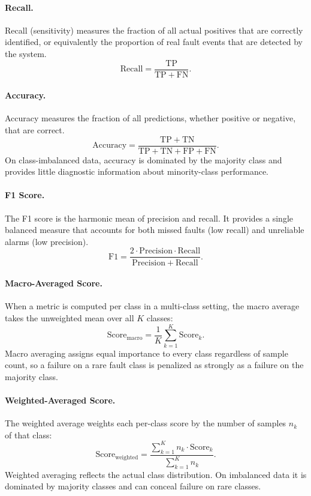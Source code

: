 \paragraph{Recall.}
Recall (sensitivity) measures the fraction of all actual positives that are correctly identified, or equivalently the proportion of real fault events that are detected by the system.
\[
  \mathrm{Recall} = \frac{\mathrm{TP}}{\mathrm{TP}+\mathrm{FN}}.
\]

\paragraph{Accuracy.}
Accuracy measures the fraction of all predictions, whether positive or negative, that are correct.
\[
  \mathrm{Accuracy} = \frac{\mathrm{TP}+\mathrm{TN}}{\mathrm{TP}+\mathrm{TN}+\mathrm{FP}+\mathrm{FN}}.
\]
On class-imbalanced data, accuracy is dominated by the majority class and provides little diagnostic information about minority-class performance.

\paragraph{F1 Score.}
The F1 score is the harmonic mean of precision and recall. It provides a single balanced measure that accounts for both missed faults (low recall) and unreliable alarms (low precision).
\[
  \mathrm{F1} = \frac{2\cdot\mathrm{Precision}\cdot\mathrm{Recall}}{\mathrm{Precision}+\mathrm{Recall}}.
\]

\paragraph{Macro-Averaged Score.}
When a metric is computed per class in a multi-class setting, the macro average takes the unweighted mean over all $K$ classes:
\[
  \mathrm{Score}_{\mathrm{macro}} = \frac{1}{K}\sum_{k=1}^{K}\mathrm{Score}_k.
\]
Macro averaging assigns equal importance to every class regardless of sample count, so a failure on a rare fault class is penalized as strongly as a failure on the majority class.

\paragraph{Weighted-Averaged Score.}
The weighted average weights each per-class score by the number of samples $n_k$ of that class:
\[
  \mathrm{Score}_{\mathrm{weighted}} = \frac{\sum_{k=1}^{K} n_k\cdot\mathrm{Score}_k}{\sum_{k=1}^{K} n_k}.
\]
Weighted averaging reflects the actual class distribution. On imbalanced data it is dominated by majority classes and can conceal failure on rare classes.


